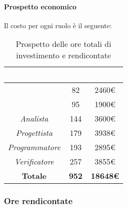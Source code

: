 \paragraph{Prospetto economico}
Il costo per ogni ruolo è il seguente:
\begin{table}[H]
	\begin{center}
		\begin{tabular}{ |c c c| }
		\rowcolor{darkblue} 
		\textcolor{white}{\textbf{Ruolo}} & \textcolor{white}{\textbf{Ore}} & \textcolor{white}{\textbf{Costo}} \\ \hline
		\textit{\Responsabile} 	& 82 	& 2460€ \\ \hline
		\textit{\Amministratore} 	& 95 	& 1900€ \\ \hline
		\textit{Analista} 		& 144 	& 3600€ \\ \hline
		\textit{Progettista} 	& 179 	& 3938€ \\ \hline
		\textit{Programmatore}  	& 193 	& 2895€ \\ \hline
		\textit{Verificatore} 	& 257 	& 3855€ \\ \hline
		\textbf{Totale} & \textbf{952} & \textbf{18648€} \\  \hline
		\end{tabular}
	\caption{ Prospetto delle ore totali di investimento e rendicontate}
	\end{center}
\end{table}
\subsubsection{Ore rendicontate}
